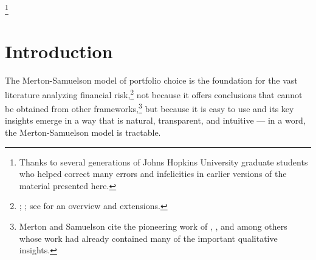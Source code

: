 \documentclass[titlepage,abstract]{\econtex}\newcommand{\texname}{ctDiscrete}
\begin{document}
\begin{authorsinfo}
\end{authorsinfo}%

\thanks{Thanks to several generations of Johns Hopkins University graduate students who helped correct many errors and infelicities in earlier versions of the material presented here.}%

\titlepagefinish%

\section{Introduction} 
The Merton-Samuelson model of portfolio choice is the foundation for
the vast literature analyzing financial
risk,\footnote{\cite{merton:restat}; \cite{samuelson:portfolio}; see
  \cite{Sethi:Thompson:2000} for an overview and extensions.}  not
because it offers conclusions that cannot be obtained from other
frameworks,\footnote{Merton and Samuelson cite the pioneering work of
  \cite{markowitz}, \cite{tobinRisk}, and \cite{phelpsRisk} among
  others whose work had already contained many of the important
  qualitative insights.} but because it is easy to use and its key
insights emerge in a way that is natural, transparent, and intuitive
--- in a word, the Merton-Samuelson model is tractable.
\end{document}

